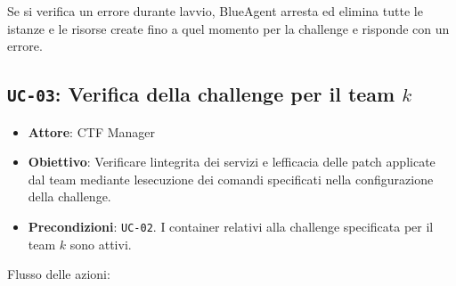 Se si verifica un errore durante l\textquotesingle avvio, BlueAgent
arresta ed elimina tutte le istanze e le risorse create fino a quel
momento per la challenge e risponde con un errore.

\subsection{\texorpdfstring{\texttt{UC-03}: Verifica della challenge per
il team
\(k\)}{UC-03: Verifica della challenge per il team k}}\label{uc-03-verifica-della-challenge-per-il-team-k}

\begin{itemize}
\tightlist
\item
  \textbf{Attore}: CTF Manager
\item
  \textbf{Obiettivo}: Verificare l\textquotesingle integrita dei servizi
  e l\textquotesingle efficacia delle patch applicate dal team mediante
  l\textquotesingle esecuzione dei comandi specificati nella
  configurazione della challenge.
\item
  \textbf{Precondizioni}: \passthrough{\lstinline!UC-02!}. I container
  relativi alla challenge specificata per il team \(k\) sono attivi.
\end{itemize}

Flusso delle azioni:

